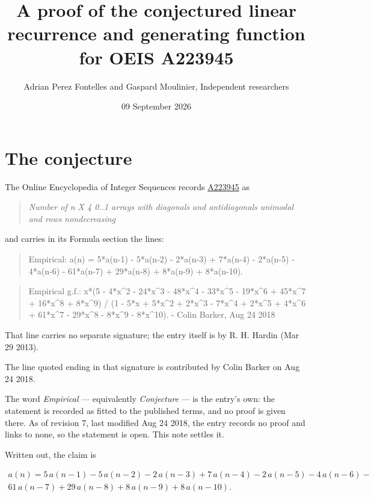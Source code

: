 \documentclass[11pt]{article}
\title{A proof of the conjectured linear recurrence and generating function for OEIS A223945}
\author{Adrian Perez Fontelles and Gaspard Moulinier, Independent researchers}
\date{09 September 2026}
\theoremstyle{definition}
\begin{document}
\maketitle
\section{The conjecture}

The Online Encyclopedia of Integer Sequences records \href{https://oeis.org/A223945}{A223945} as

\begin{quote}\itshape Number of n X 4 0..1 arrays with diagonals and antidiagonals unimodal and rows nondecreasing\end{quote}

and carries in its Formula section the lines:

\begin{quote}\ttfamily Empirical: a(n) = 5*a(n-1) - 5*a(n-2) - 2*a(n-3) + 7*a(n-4) - 2*a(n-5) - 4*a(n-6) - 61*a(n-7) + 29*a(n-8) + 8*a(n-9) + 8*a(n-10).\end{quote}

\begin{quote}\ttfamily Empirical g.f.: x*(5 - 4*x\textasciicircum{}2 - 24*x\textasciicircum{}3 - 48*x\textasciicircum{}4 - 33*x\textasciicircum{}5 - 19*x\textasciicircum{}6 + 45*x\textasciicircum{}7 + 16*x\textasciicircum{}8 + 8*x\textasciicircum{}9) / (1 - 5*x + 5*x\textasciicircum{}2 + 2*x\textasciicircum{}3 - 7*x\textasciicircum{}4 + 2*x\textasciicircum{}5 + 4*x\textasciicircum{}6 + 61*x\textasciicircum{}7 - 29*x\textasciicircum{}8 - 8*x\textasciicircum{}9 - 8*x\textasciicircum{}10). - Colin Barker, Aug 24 2018\end{quote}

That line carries no separate signature; the entry itself is by R. H. Hardin (Mar 29 2013).

The line quoted ending in that signature is contributed by Colin Barker on Aug 24 2018.

The word {\itshape Empirical} --- equivalently {\itshape Conjecture} --- is the entry's own: the statement is recorded as fitted to the published terms, and no proof is given there. As of revision 7, last modified Aug 24 2018, the entry records no proof and links to none, so the statement is open. This note settles it.

Written out, the claim is

\begin{multline*} a(n) = 5\,a(n-1) - 5\,a(n-2) - 2\,a(n-3) + 7\,a(n-4) - 2\,a(n-5) - 4\,a(n-6) - \\ 61\,a(n-7) + 29\,a(n-8) + 8\,a(n-9) + 8\,a(n-10). \end{multline*}
\end{document}
